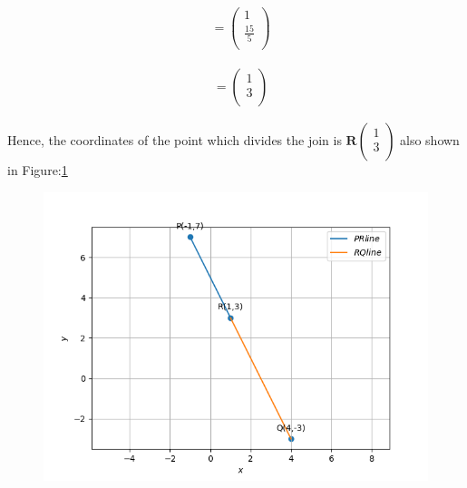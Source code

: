 \documentclass[12pt]{article}
\newcommand{\myvec}[1]{\ensuremath{\begin{pmatrix}#1\end{pmatrix}}}
\let\vec\mathbf
\begin{document}
\begin{align}
	&=\myvec{
1\\
	\frac{15}{5}\\
}
\end{align}


\begin{align}
	&=\myvec{
        1\\
        3\\
  }
  \end{align}




Hence, the coordinates of the point which divides the join is $\vec{R}\myvec{1\\3\\}$ also shown in Figure:\ref{fig:Fig}


\begin{figure}[!h]
\begin{center}
   \includegraphics[width=\columnwidth]{./figs/linefig.png}
\end{center}
\caption{}
\label{fig:Fig}
\end{figure}
\end{document}
